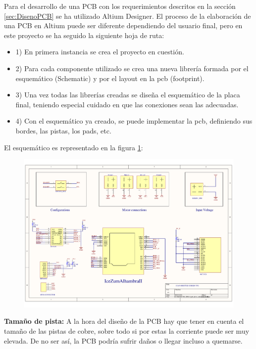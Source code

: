 Para el desarrollo de una PCB con los requerimientos descritos en la sección \ref{sec:DisenoPCB} se ha utilizado Altium Designer. El proceso de la elaboración de una PCB en Altium puede ser diferente dependiendo del usuario final, pero en este proyecto se ha seguido la siguiente hoja de ruta:

\begin{itemize}
	\item 1) En primera instancia se crea el proyecto en cuestión.
	\item 2) Para cada componente utilizado se crea una nueva librería formada por el esquemático (Schematic) y por el layout en la pcb (footprint).
	\item 3) Una vez todas las librerías creadas se diseña el esquemático de la placa final, teniendo especial cuidado en que las conexiones sean las adecuadas.
	\item 4) Con el esquemático ya creado, se puede implementar la pcb, definiendo sus bordes, las pistas, los pads, etc.
\end{itemize}

El esquemático es representado en la figura \ref{fig:schematics_tfg}: 
\newpage

\begin{center}
	\begin{figure}[H]
		\center
		\includegraphics[scale=0.8, angle=90]{imagenes/Balancing_Robot/pcb_dron_schematic.pdf}
		\caption{}
		\label{fig:schematics_tfg}
	\end{figure}
\end{center}
\newpage

\textbf{Tamaño de pista: } \newline
A la hora del diseño de la PCB hay que tener en cuenta el tamaño de las pistas de cobre, sobre todo si por estas la corriente puede ser muy elevada. De no ser así, la PCB podría sufrir daños o llegar incluso a quemarse. \newline

